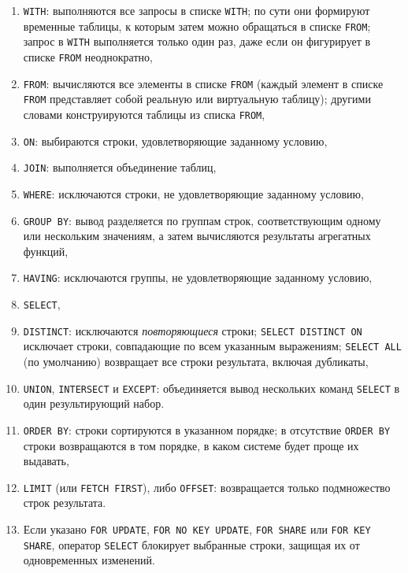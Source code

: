 \documentclass[%
	11pt,
	a4paper,
	utf8,
		]{article}
\begin{document}
\begin{enumerate}
	\item \texttt{WITH}: выполняются все запросы в списке \texttt{WITH}; по сути они формируют временные таблицы, к которым затем можно обращаться в списке \texttt{FROM}; запрос в \texttt{WITH} выполняется только один раз, даже если он фигурирует в списке \texttt{FROM} неоднократно,
	
	\item \texttt{FROM}: вычисляются все элементы в списке \texttt{FROM} (каждый элемент в списке \texttt{FROM} представляет собой реальную или виртуальную таблицу); другими словами конструируются таблицы из списка \texttt{FROM},
	
	\item \texttt{ON}: выбираются строки, удовлетворяющие заданному условию,
	
	\item \texttt{JOIN}: выполняется объединение таблиц,
	
	\item \texttt{WHERE}: исключаются строки, не удовлетворяющие заданному условию,
	
	\item \texttt{GROUP BY}: вывод разделяется по группам строк, соответствующим одному или нескольким значениям, а затем вычисляются результаты агрегатных функций,
	
	\item \texttt{HAVING}: исключаются группы, не удовлетворяющие заданному условию,
	
	\item \texttt{SELECT},
	
	\item \texttt{DISTINCT}: исключаются \emph{повторяющиеся} строки; \texttt{SELECT DISTINCT ON} исключает строки, совпадающие по всем указанным выражениям; \texttt{SELECT ALL} (по умолчанию) возвращает все строки результата, включая дубликаты,
	
	\item \texttt{UNION}, \texttt{INTERSECT} и \texttt{EXCEPT}: объединяется вывод нескольких команд \texttt{SELECT} в один результирующий набор.
	
	\item \texttt{ORDER BY}: строки сортируются в указанном порядке; в отсутствие \texttt{ORDER BY} строки возвращаются в том порядке, в каком системе будет проще их выдавать,
	
	\item \texttt{LIMIT} (или \texttt{FETCH FIRST}), либо \texttt{OFFSET}: возвращается только подмножество строк результата.
	
	\item Если указано \texttt{FOR UPDATE}, \texttt{FOR NO KEY UPDATE}, \texttt{FOR SHARE} или \texttt{FOR KEY SHARE}, оператор \texttt{SELECT} блокирует выбранные строки, защищая их от одновременных изменений.
\end{enumerate}
\end{document}
